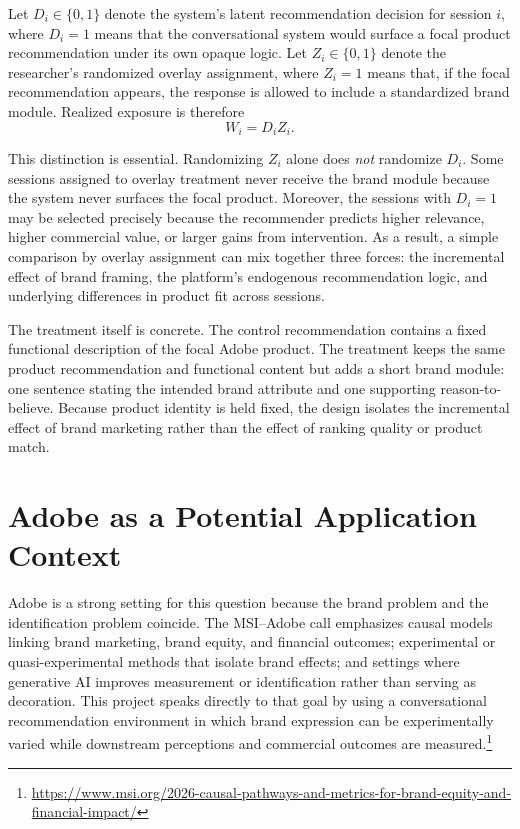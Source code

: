 \documentclass[11pt]{article}
\begin{document}
Let $D_i \in \{0,1\}$ denote the system's latent recommendation decision for session $i$, where $D_i=1$ means that the conversational system would surface a focal product recommendation under its own opaque logic. Let $Z_i \in \{0,1\}$ denote the researcher's randomized overlay assignment, where $Z_i=1$ means that, if the focal recommendation appears, the response is allowed to include a standardized brand module. Realized exposure is therefore
\[
W_i = D_i Z_i.
\]

This distinction is essential. Randomizing $Z_i$ alone does \emph{not} randomize $D_i$. Some sessions assigned to overlay treatment never receive the brand module because the system never surfaces the focal product. Moreover, the sessions with $D_i=1$ may be selected precisely because the recommender predicts higher relevance, higher commercial value, or larger gains from intervention. As a result, a simple comparison by overlay assignment can mix together three forces: the incremental effect of brand framing, the platform's endogenous recommendation logic, and underlying differences in product fit across sessions.

The treatment itself is concrete. The control recommendation contains a fixed functional description of the focal Adobe product. The treatment keeps the same product recommendation and functional content but adds a short brand module: one sentence stating the intended brand attribute and one supporting reason-to-believe. Because product identity is held fixed, the design isolates the incremental effect of brand marketing rather than the effect of ranking quality or product match.

\section{Adobe as a Potential Application Context}

Adobe is a strong setting for this question because the brand problem and the identification problem coincide. The MSI--Adobe call emphasizes causal models linking brand marketing, brand equity, and financial outcomes; experimental or quasi-experimental methods that isolate brand effects; and settings where generative AI improves measurement or identification rather than serving as decoration. This project speaks directly to that goal by using a conversational recommendation environment in which brand expression can be experimentally varied while downstream perceptions and commercial outcomes are measured.\footnote{\url{https://www.msi.org/2026-causal-pathways-and-metrics-for-brand-equity-and-financial-impact/}}
\end{document}
